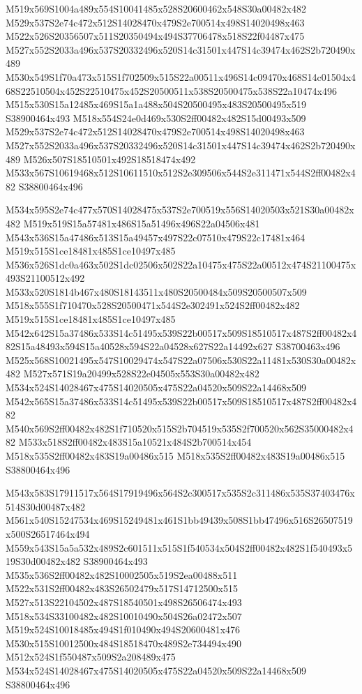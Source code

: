 \documentclass{article}
\begin{document}
\begin{multicols}{2}
M519x569S1004a489x554S10041485x528S20600462x548S30a00482x482 M529x537S2e74c472x512S14028470x479S2e700514x498S14020498x463 M522x526S20356507x511S20350494x494S37706478x518S22f04487x475 M527x552S2033a496x537S20332496x520S14c31501x447S14c39474x462S2b720490x489 M530x549S1f70a473x515S1f702509x515S22a00511x496S14c09470x468S14c01504x468S22510504x452S22510475x452S20500511x538S20500475x538S22a10474x496 M515x530S15a12485x469S15a1a488x504S20500495x483S20500495x519 S38900464x493 M518x554S24e0d469x530S2ff00482x482S15d00493x509 M529x537S2e74c472x512S14028470x479S2e700514x498S14020498x463 M527x552S2033a496x537S20332496x520S14c31501x447S14c39474x462S2b720490x489 M526x507S18510501x492S18518474x492 M533x567S10619468x512S10611510x512S2e309506x544S2e311471x544S2ff00482x482 S38800464x496

M534x595S2e74c477x570S14028475x537S2e700519x556S14020503x521S30a00482x482 M519x519S15a57481x486S15a51496x496S22a04506x481 M543x536S15a47486x513S15a49457x497S22c07510x479S22c17481x464 M519x515S1ce18481x485S1ce10497x485 M536x526S1dc0a463x502S1dc02506x502S22a10475x475S22a00512x474S21100475x493S21100512x492 M533x520S1814b467x480S18143511x480S20500484x509S20500507x509 M518x555S1f710470x528S20500471x544S2e302491x524S2ff00482x482 M519x515S1ce18481x485S1ce10497x485 M542x642S15a37486x533S14c51495x539S22b00517x509S18510517x487S2ff00482x482S15a48493x594S15a40528x594S22a04528x627S22a14492x627 S38700463x496 M525x568S10021495x547S10029474x547S22a07506x530S22a11481x530S30a00482x482 M527x571S19a20499x528S22e04505x553S30a00482x482 M534x524S14028467x475S14020505x475S22a04520x509S22a14468x509 M542x565S15a37486x533S14c51495x539S22b00517x509S18510517x487S2ff00482x482 M540x569S2ff00482x482S1f710520x515S2b704519x535S2f700520x562S35000482x482 M533x518S2ff00482x483S15a10521x484S2b700514x454 M518x535S2ff00482x483S19a00486x515 M518x535S2ff00482x483S19a00486x515 S38800464x496

M543x583S17911517x564S17919496x564S2c300517x535S2c311486x535S37403476x514S30d00487x482 M561x540S15247534x469S15249481x461S1bb49439x508S1bb47496x516S26507519x500S26517464x494 M559x543S15a5a532x489S2c601511x515S1f540534x504S2ff00482x482S1f540493x519S30d00482x482 S38900464x493 M535x536S2ff00482x482S10002505x519S2ea00488x511 M522x531S2ff00482x483S26502479x517S14712500x515 M527x513S22104502x487S18540501x498S26506474x493 M518x534S33100482x482S10010490x504S26a02472x507 M519x524S10018485x494S1f010490x494S20600481x476 M530x515S10012500x484S18518470x489S2e734494x490 M512x524S1f550487x509S2a208489x475 M534x524S14028467x475S14020505x475S22a04520x509S22a14468x509 S38800464x496


\end{multicols}
\end{document}
